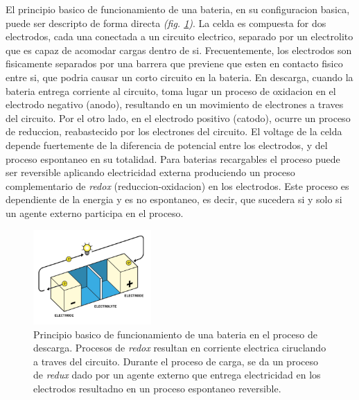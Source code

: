\documentclass[10pt,a4paper]{article}
\begin{document}
    \noindent El principio basico de funcionamiento de una bateria, en su configuracion
    basica, puede ser descripto de forma directa \emph{(fig. \ref{batt_wk_ppl})}. 
    La celda es compuesta for dos electrodos, cada una conectada a un circuito 
    electrico, separado por un electrolito que es capaz de acomodar cargas
    dentro de si. Frecuentemente, los electrodos son fisicamente separados por
    una barrera que previene que esten en contacto fisico entre si, que podria
    causar un corto circuito en la bateria. En descarga, cuando la bateria
    entrega corriente al circuito, toma lugar un proceso de oxidacion en el
    electrodo negativo (anodo), resultando en un movimiento de electrones a
    traves del circuito. Por el otro lado, en el electrodo positivo (catodo),
    ocurre un proceso de reduccion, reabastecido por los electrones del
    circuito. El voltage de la celda depende fuertemente de la diferencia de
    potencial entre los electrodos, y del proceso espontaneo en su totalidad.
    Para baterias recargables el proceso puede ser reversible aplicando
    electricidad externa produciendo un proceso complementario de \emph{redox}
    (reduccion-oxidacion) en los electrodos. Este proceso es dependiente de la
    energia y es no espontaneo, es decir, que sucedera si y solo si un agente
    externo participa en el proceso.

    \begin{figure}[h!]
        \begin{center}
            \includegraphics[width=0.4\textwidth]{batt_func_ppr.png}
        \end{center}
        \caption{Principio basico de funcionamiento de una bateria en el
        proceso de descarga. Procesos de \emph{redox} resultan en corriente
        electrica ciruclando a traves del circuito. Durante el proceso de
        carga, se da un proceso de \emph{redux} dado por un agente externo 
        que entrega electricidad en los electrodos resultadno en un proceso
        espontaneo reversible.}
        \label{batt_wk_ppl}
    \end{figure}
\end{document}
